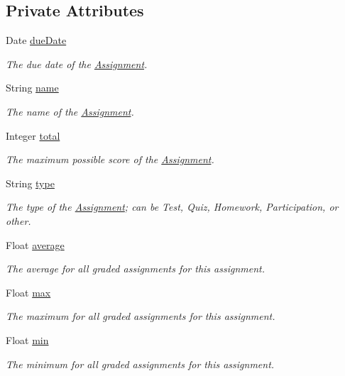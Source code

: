 \subsection*{Private Attributes}
\begin{CompactItemize}
\item 
Date \hyperlink{classAssignment_d47ded463c5c705bb2d81719162a3311}{dueDate}
\begin{CompactList}\small\item\em The due date of the \hyperlink{classAssignment}{Assignment}. \item\end{CompactList}\item 
String \hyperlink{classAssignment_9316fddce1df1f4f469920d57f952735}{name}
\begin{CompactList}\small\item\em The name of the \hyperlink{classAssignment}{Assignment}. \item\end{CompactList}\item 
Integer \hyperlink{classAssignment_b1d959bf57209d29038de35778662b3c}{total}
\begin{CompactList}\small\item\em The maximum possible score of the \hyperlink{classAssignment}{Assignment}. \item\end{CompactList}\item 
String \hyperlink{classAssignment_6315f69bacfc69c4328db4113801b27f}{type}
\begin{CompactList}\small\item\em The type of the \hyperlink{classAssignment}{Assignment}; can be Test, Quiz, Homework, Participation, or other. \item\end{CompactList}\item 
Float \hyperlink{classAssignment_ce710f4a8ac6b50cc6765e6b7ab9c1f0}{average}
\begin{CompactList}\small\item\em The average for all graded assignments for this assignment. \item\end{CompactList}\item 
Float \hyperlink{classAssignment_4ed2fd5e6b8df438191e5094bc0073b8}{max}
\begin{CompactList}\small\item\em The maximum for all graded assignments for this assignment. \item\end{CompactList}\item 
Float \hyperlink{classAssignment_eedf9bd76e822f98da0b732882001575}{min}
\begin{CompactList}\small\item\em The minimum for all graded assignments for this assignment. \item\end{CompactList}\end{CompactItemize}


